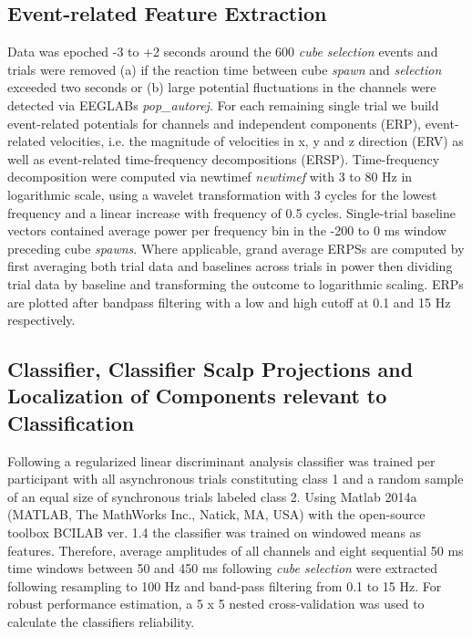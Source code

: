 \subsection{Event-related Feature Extraction}
Data was epoched -3 to +2 seconds around the 600 \textit{cube selection} events and trials were removed (a) if the reaction time between cube \textit{spawn} and \textit{selection} exceeded two seconds or (b) large potential fluctuations in the channels were detected via EEGLABs \textit{pop_autorej}.
For each remaining single trial we build event-related potentials for channels and independent components (ERP), event-related velocities, i.e. the magnitude of velocities in x, y and z direction (ERV) as well as event-related time-frequency decompositions (ERSP). Time-frequency decomposition were computed via newtimef \textit{newtimef} with 3 to 80 Hz in logarithmic scale, using a wavelet transformation with 3 cycles for the lowest frequency and a linear increase with frequency of 0.5 cycles. Single-trial baseline vectors contained average power per frequency bin in the -200 to 0 ms window preceding cube \textit{spawns}. Where applicable, grand average ERPSs are computed by first averaging both trial data and baselines across trials in power then dividing trial data by baseline and transforming the outcome to logarithmic scaling. ERPs are plotted after bandpass filtering with a low and high cutoff at 0.1 and 15 Hz respectively.

\subsection{Classifier, Classifier Scalp Projections and Localization of Components relevant to Classification}
Following \citet{Zander2016} a regularized linear discriminant analysis classifier was trained per participant with all asynchronous trials constituting class 1 and a random sample of an equal size of synchronous trials labeled class 2. Using Matlab 2014a (MATLAB, The MathWorks Inc., Natick, MA, USA) with the open-source toolbox BCILAB ver. 1.4 the classifier was trained on windowed means as features. Therefore, average amplitudes of all channels and eight sequential 50 ms time windows between 50 and 450 ms following \textit{cube selection} were extracted following resampling to 100 Hz and band-pass filtering from 0.1 to 15 Hz. For robust performance estimation, a 5 x 5 nested cross-validation was used to calculate the classifiers reliability.

